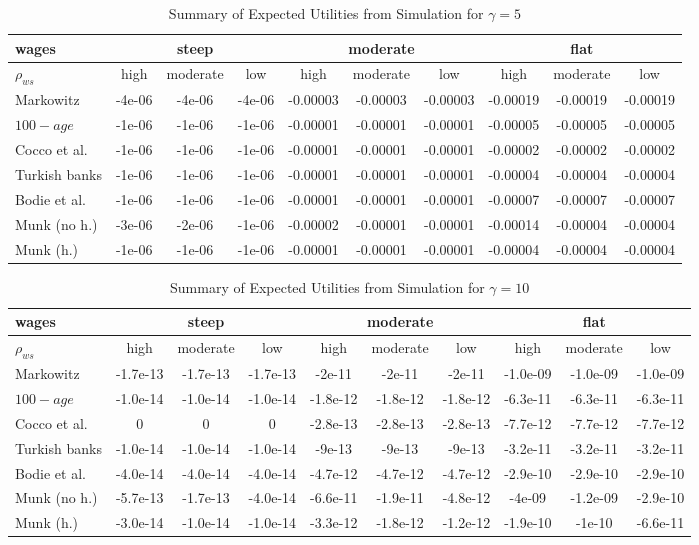 \begin{table}[h!]
	\scriptsize
	\centering
	\caption{Summary of Expected Utilities from Simulation for $\gamma=5$}
	\label{table:utilc}
	\begin{tabular}[c]{|l|ccc|ccc|ccc|}
		\hline
		 wages& \multicolumn{3}{c|}{steep} & \multicolumn{3}{c|}{moderate} & \multicolumn{3}{c|}{flat}\\
		\hline
		$\rho_{ws}$&high&moderate&low&high&moderate&low&high&moderate&low\\
		\hline
Markowitz					&-4e-06&-4e-06&-4e-06&-0.00003&-0.00003&-0.00003&-0.00019&-0.00019&-0.00019\\
$100-age$					&-1e-06&-1e-06&-1e-06&-0.00001&-0.00001&-0.00001&-0.00005&-0.00005&-0.00005\\
Cocco et al.				&-1e-06&-1e-06&-1e-06&-0.00001&-0.00001&-0.00001&-0.00002&-0.00002&-0.00002\\
Turkish banks			 	&-1e-06&-1e-06&-1e-06&-0.00001&-0.00001&-0.00001&-0.00004&-0.00004&-0.00004\\
Bodie et al.			 	&-1e-06&-1e-06&-1e-06&-0.00001&-0.00001&-0.00001&-0.00007&-0.00007&-0.00007\\
Munk (no h.)				&-3e-06&-2e-06&-1e-06&-0.00002&-0.00001&-0.00001&-0.00014&-0.00004&-0.00004\\
Munk (h.)					&-1e-06&-1e-06&-1e-06&-0.00001&-0.00001&-0.00001&-0.00004&-0.00004&-0.00004\\
	\hline
	\end{tabular}
\end{table}
\begin{table}[h!]
	\scriptsize
	\centering
	\caption{Summary of Expected Utilities from Simulation for $\gamma=10$}
	\label{table:utild}
	\begin{tabular}[c]{|l|ccc|ccc|ccc|}
		\hline
		 wages& \multicolumn{3}{c|}{steep} & \multicolumn{3}{c|}{moderate} & \multicolumn{3}{c|}{flat}\\
		\hline
		$\rho_{ws}$&high&moderate&low&high&moderate&low&high&moderate&low\\
		\hline
Markowitz					&-1.7e-13&-1.7e-13&-1.7e-13&-2e-11  &-2e-11  &-2e-11  &-1.0e-09&-1.0e-09&-1.0e-09\\
$100-age$					&-1.0e-14&-1.0e-14&-1.0e-14&-1.8e-12&-1.8e-12&-1.8e-12&-6.3e-11&-6.3e-11&-6.3e-11\\
Cocco et al.				&0		 &0       &0       &-2.8e-13&-2.8e-13&-2.8e-13&-7.7e-12&-7.7e-12&-7.7e-12\\
Turkish banks			 	&-1.0e-14&-1.0e-14&-1.0e-14&-9e-13	&-9e-13	 &-9e-13  &-3.2e-11&-3.2e-11&-3.2e-11\\
Bodie et al.			 	&-4.0e-14&-4.0e-14&-4.0e-14&-4.7e-12&-4.7e-12&-4.7e-12&-2.9e-10&-2.9e-10&-2.9e-10\\
Munk (no h.)				&-5.7e-13&-1.7e-13&-4.0e-14&-6.6e-11&-1.9e-11&-4.8e-12&-4e-09  &-1.2e-09&-2.9e-10\\
Munk (h.)					&-3.0e-14&-1.0e-14&-1.0e-14&-3.3e-12&-1.8e-12&-1.2e-12&-1.9e-10&-1e-10  &-6.6e-11\\
	\hline
	\end{tabular}
\end{table}
